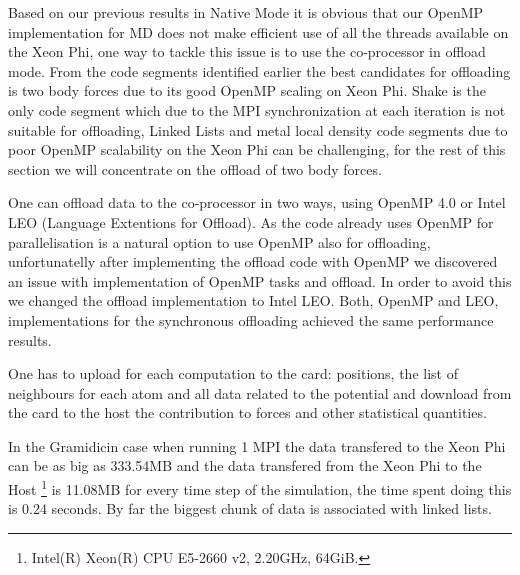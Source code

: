 \par{Based on our previous results in Native Mode it is obvious that our OpenMP implementation for MD does not make efficient use
of all the threads available on the Xeon Phi, one way to tackle this issue is to use the co-processor in offload mode. From the 
code segments identified earlier the best candidates for offloading is two body forces due to its good OpenMP scaling on Xeon Phi. 
Shake is the only code segment which due to the MPI synchronization at each iteration is not suitable for offloading, 
Linked Lists and metal local density code segments due to poor OpenMP scalability on the Xeon Phi can be challenging, 
for the rest of this section we will concentrate on the offload of two body forces.}

\par{One can offload data to the co-processor in two ways, using OpenMP 4.0 or Intel LEO (Language Extentions for Offload). As the
code already uses OpenMP for parallelisation is a natural option to use OpenMP also for offloading, unfortunatelly after 
implementing the offload code with OpenMP we discovered an issue with implementation of OpenMP tasks and offload. In order to 
avoid this we changed the offload implementation to Intel LEO. Both, OpenMP and LEO, implementations for the synchronous 
offloading achieved the same performance results.}

\par{One has to upload for each computation to the card: positions, the list of neighbours for each atom and all data related to 
the potential and download from the card to the host the contribution to forces and other statistical quantities.}

\par{In the Gramidicin case when running 1 MPI the data transfered to the Xeon Phi can be as big as 333.54MB and the data 
transfered from the Xeon Phi to the Host \footnote{Intel(R) Xeon(R) CPU E5-2660 v2, 2.20GHz, 64GiB.} is 11.08MB for every time 
step of the simulation, the time spent doing this is 0.24 seconds. By far the biggest chunk of data is associated with 
linked lists.}

